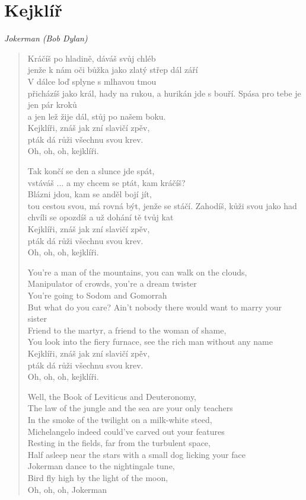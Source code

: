 \section*{Kejklíř}

\textit{Jokerman (Bob Dylan)}

\begin{verse}
Kráčíš po hladině, dáváš svůj chléb\\
jenže k nám oči bůžka jako zlatý střep dál září\\ 
V dálce loď splyne s mlhavou tmou\\
přicházíš jako král, hady na rukou, a hurikán jde s bouří. 
Spása pro tebe je jen pár kroků\\
a jen lež žije dál, stůj po našem boku. \\
Kejklíři, znáš jak zní slavičí zpěv,\\
pták dá růži všechnu svou krev. \\
Oh, oh, oh, kejklíři.

Tak končí se den a slunce jde spát, \\
vstáváš ... a my chcem se ptát, kam kráčíš? \\
Blázni jdou, kam se anděl bojí jít, \\
tou cestou svou, má rovná být, jenže se stáčí.
Zahodíš, kůži svou jako had \\
chvíli se opozdíš a už dohání tě tvůj kat \\
Kejklíři, znáš jak zní slavičí zpěv,\\
pták dá růži všechnu svou krev. \\
Oh, oh, oh, kejklíři.

You're a man of the mountains, you can walk on the clouds, \\
Manipulator of crowds, you're a dream twister \\
You're going to Sodom and Gomorrah \\
But what do you care? Ain't nobody there would want to marry your sister \\
Friend to the martyr, a friend to the woman of shame, \\
You look into the fiery furnace, see the rich man without any name \\
Kejklíři, znáš jak zní slavičí zpěv,\\
pták dá růži všechnu svou krev. \\
Oh, oh, oh, kejklíři.

Well, the Book of Leviticus and Deuteronomy, \\
The law of the jungle and the sea are your only teachers \\
In the smoke of the twilight on a milk-white steed, \\
Michelangelo indeed could've carved out your features \\
Resting in the fields, far from the turbulent space, \\
Half asleep near the stars with a small dog licking your face \\
Jokerman dance to the nightingale tune, \\
Bird fly high by the light of the moon, \\
Oh, oh, oh, Jokerman


\end{verse}
